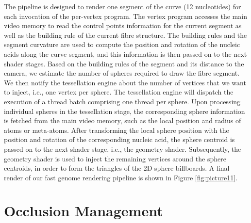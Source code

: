 The pipeline is designed to render one segment of the curve (12 nucleotides) for each invocation of the per-vertex program.
The vertex program accesses the main video memory to read the control points information for the current segment as well as the building rule of the current fibre structure.
The building rules and the segment curvature are used to compute the position and rotation of the nucleic acids along the curve segment, and this information is then passed on to the next shader stages.
Based on the building rules of the segment and its distance to the camera, we estimate the number of spheres required to draw the fibre segment.
We then notify the tessellation engine about the number of vertices that we want to inject, i.e., one vertex per sphere.
The tessellation engine will dispatch the execution of a thread batch comprising one thread per sphere.
Upon processing individual spheres in the tessellation stage, the corresponding sphere information is fetched from the main video memory, such as the local position and radius of atoms or meta-atoms.
After transforming the local sphere position with the position and rotation of the corresponding nucleic acid, the sphere centroid is passed on to the next shader stage, i.e., the geometry shader.
Subsequently, the geometry shader is used to inject the remaining vertices around the sphere centroids, in order to form the triangles of the 2D sphere billboards.
A final render of our fast genome rendering pipeline is shown in Figure \ref{fig:picture11}.

\section{Occlusion Management}


